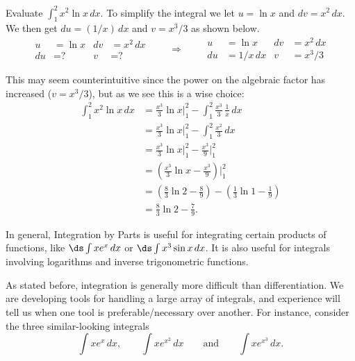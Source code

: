 \begin{example}\label{ex_ibp7}
Evaluate $\displaystyle \int_1^2 x^2 \ln x \,dx$.
\solution
To simplify the integral we let $u=\ln x$ and $dv =x^2\,dx$. 
We then get $du = (1/x)\,dx$ and $v=x^3/3$ as shown below.
\[
\begin{aligned}
u&= \ln x & dv&=x^2\, dx\\
du&= \text{?} & v&=\text{?}
\end{aligned}
\qquad\Rightarrow\qquad
\begin{aligned}
u&= \ln x& dv&=x^2\, dx\\
du&= 1/x\, dx & v&=x^3/3
\end{aligned}
\]

This may seem counterintuitive since the power on the algebraic factor has increased ($v=x^3/3$), but as we see this is a wise choice:
\begin{align*}
	\int_1^2 x^2 \ln x\,dx
	&= \frac{x^3}3\ln x\bigg|_1^2 - \int_1^2 \frac{x^3}{3}\,\frac 1x\,dx \\
	&=  \frac{x^3}3\ln x\bigg|_1^2 - \int_1^2 \frac{x^2}{3}\,dx \\
	&=  \frac{x^3}3\ln x\bigg|_1^2 - \frac{x^3}{9}\bigg|_1^2\\
	&=  \left(\frac{x^3}3\ln x - \frac{x^3}{9}\right)\bigg|_1^2\\
	&=	\left(\frac83\ln 2 - \frac89\right)-\left(\frac13\ln 1 - \frac19\right) \\
	&= \frac83\ln 2 - \frac79. %
\end{align*}
\end{example}

In general, Integration by Parts is useful for integrating certain products of functions, like $\ds\int x e^x\,dx$ or $\ds\int x^3\sin x\,dx$.   It is also useful for integrals involving logarithms and inverse trigonometric functions.  

As stated before, integration is generally more difficult than differentiation. We are developing tools for handling a large array of integrals, and experience will tell us when one tool is preferable/necessary over another. For instance, consider the three similar-looking integrals 
\[
\int xe^x\,dx, \qquad  \int x e^{x^2}\,dx \qquad \text{and} \qquad \int xe^{x^3}\,dx.
\]

